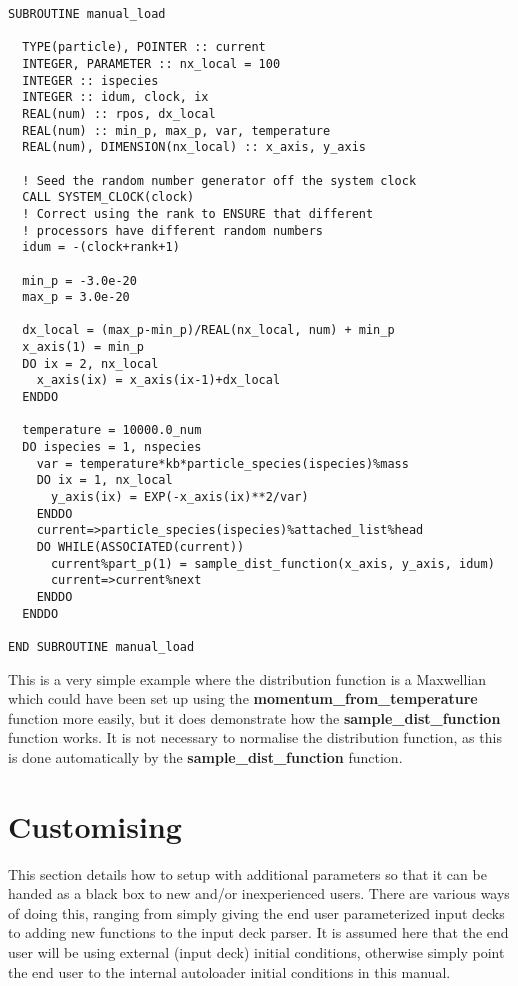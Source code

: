 \documentclass[12pt,a4paper]{article}
\newcommand{\simpleboxverbatim}{\begin{Verbatim}[obeytabs=true,frame=single,
  framerule=0.5mm,rulecolor=\color{warwickmid},formatcom=\color{black}]}
\newcommand{\EPOCH}{{\color{warwickdark}\fontfamily{phv}\selectfont{EPOCH}}}
\begin{document}
\simpleboxverbatim
SUBROUTINE manual_load

  TYPE(particle), POINTER :: current
  INTEGER, PARAMETER :: nx_local = 100
  INTEGER :: ispecies
  INTEGER :: idum, clock, ix
  REAL(num) :: rpos, dx_local
  REAL(num) :: min_p, max_p, var, temperature
  REAL(num), DIMENSION(nx_local) :: x_axis, y_axis

  ! Seed the random number generator off the system clock
  CALL SYSTEM_CLOCK(clock)
  ! Correct using the rank to ENSURE that different
  ! processors have different random numbers
  idum = -(clock+rank+1)

  min_p = -3.0e-20
  max_p = 3.0e-20

  dx_local = (max_p-min_p)/REAL(nx_local, num) + min_p
  x_axis(1) = min_p
  DO ix = 2, nx_local
    x_axis(ix) = x_axis(ix-1)+dx_local
  ENDDO

  temperature = 10000.0_num
  DO ispecies = 1, nspecies
    var = temperature*kb*particle_species(ispecies)%mass
    DO ix = 1, nx_local
      y_axis(ix) = EXP(-x_axis(ix)**2/var)
    ENDDO
    current=>particle_species(ispecies)%attached_list%head
    DO WHILE(ASSOCIATED(current))
      current%part_p(1) = sample_dist_function(x_axis, y_axis, idum)
      current=>current%next
    ENDDO
  ENDDO

END SUBROUTINE manual_load
\end{Verbatim}

This is a very simple example where the distribution function is a Maxwellian
which could have been set up using the {\bf momentum\_from\_temperature}
function more easily, but it does demonstrate how the
{\bf sample\_dist\_function} function works. It is not necessary to normalise
the distribution function, as this is done automatically by the
{\bf sample\_dist\_function} function.

\section{Customising {\EPOCH}}
This section details how to setup {\EPOCH} with additional parameters so that it
can be handed as a black box to new and/or inexperienced users. There are
various ways of doing this, ranging from simply giving the end user
parameterized input decks to adding new functions to the input deck parser. It
is assumed here that the end user will be using external (input deck) initial
conditions, otherwise simply point the end user to the internal autoloader
initial conditions in this manual.
\end{document}
